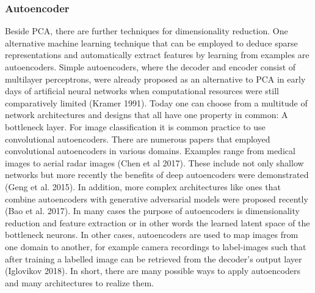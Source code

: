 \subsubsection{Autoencoder}

Beside PCA, there are further techniques for dimensionality reduction. One alternative machine learning technique that can be employed to deduce sparse representations and automatically extract features by learning from examples are autoencoders. Simple autoencoders, where the decoder and encoder consist of multilayer perceptrons, were already proposed as an alternative to PCA in early days of artificial neural networks when computational resources were still comparatively limited (Kramer 1991). Today one can choose from a multitude of network architectures and designs that all have one property in common: A bottleneck layer. For image classification it is common practice to use convolutional autoencoders. There are numerous papers that employed convolutional autoencoders in various domains. Examples range from medical images to aerial radar images (Chen et al 2017). These include not only shallow networks but more recently the benefits of deep autoencoders were demonstrated (Geng et al. 2015). In addition, more complex architectures like ones that combine autoencoders with generative adversarial models were proposed recently (Bao et al. 2017). In many cases the purpose of autoencoders is dimensionality reduction and feature extraction or in other words the learned latent space of the bottleneck neurons. In other cases, autoencoders are used to map images from one domain to another, for example camera recordings to label-images such that after training a labelled image can be retrieved from the decoder’s output layer (Iglovikov 2018). In short, there are many possible ways to apply autoencoders and many architectures to realize them. \\
\\
